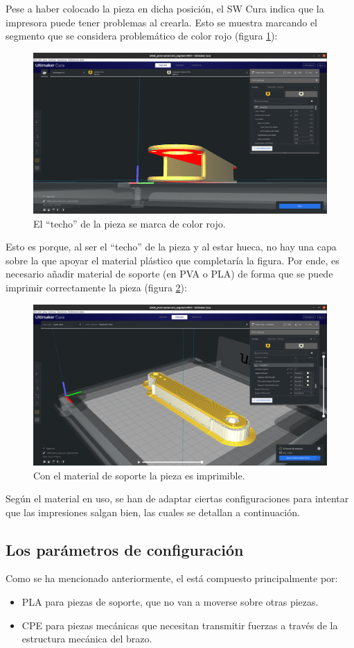 Pese a haber colocado la pieza en dicha posición, el \ac{SW} Cura indica que la impresora
puede tener problemas al crearla. Esto se muestra marcando el segmento que se considera
problemático de color rojo (figura \ref{fig:vpiece_err}):

\begin{figure}[H]
    \centering
    \includegraphics[width=.7\linewidth]{pictures/v_piece_err.png}
    \caption{El ``techo'' de la pieza se marca de color rojo.}
    \label{fig:vpiece_err}
\end{figure}

Esto es porque, al ser el ``techo'' de la pieza y al estar hueca, no hay una capa sobre
la que apoyar el material plástico que completaría la figura. Por ende, es necesario
añadir material de soporte (en \ac{PVA} o \ac{PLA}) de forma que se puede imprimir
correctamente la pieza (figura \ref{fig:vpiece_ok}):

\begin{figure}[H]
    \centering
    \includegraphics[width=.7\linewidth]{pictures/v_piece_ok.png}
    \caption{Con el material de soporte la pieza es imprimible.}
    \label{fig:vpiece_ok}
\end{figure}

Según el material en uso, se han de adaptar ciertas configuraciones para intentar que
las impresiones salgan bien, las cuales se detallan a continuación.

\subsection{Los parámetros de configuración}
Como se ha mencionado anteriormente, el \pArm{} está compuesto principalmente por:
\begin{itemize}
    \item \ac{PLA} para piezas de soporte, que no van a moverse sobre otras piezas.
    \item \ac{CPE} para piezas mecánicas que necesitan transmitir fuerzas a través
    de la estructura mecánica del brazo.
\end{itemize}

